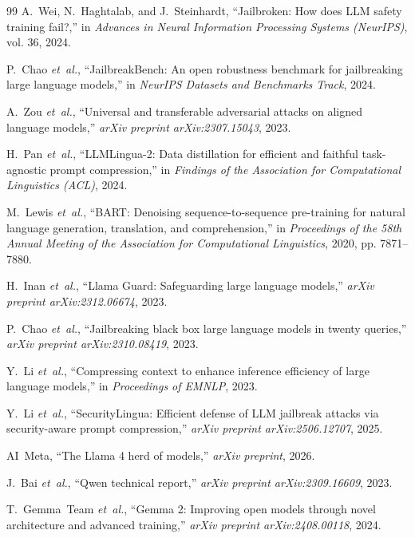 \documentclass[conference]{IEEEtran}
\begin{document}
\begin{thebibliography}{99}
A.~Wei, N.~Haghtalab, and J.~Steinhardt, ``Jailbroken: How does LLM safety training fail?,'' in \emph{Advances in Neural Information Processing Systems (NeurIPS)}, vol. 36, 2024.

P.~Chao \emph{et~al.}, ``JailbreakBench: An open robustness benchmark for jailbreaking large language models,'' in \emph{NeurIPS Datasets and Benchmarks Track}, 2024.

A.~Zou \emph{et~al.}, ``Universal and transferable adversarial attacks on aligned language models,'' \emph{arXiv preprint arXiv:2307.15043}, 2023.

H.~Pan \emph{et~al.}, ``LLMLingua-2: Data distillation for efficient and faithful task-agnostic prompt compression,'' in \emph{Findings of the Association for Computational Linguistics (ACL)}, 2024.

M.~Lewis \emph{et~al.}, ``BART: Denoising sequence-to-sequence pre-training for natural language generation, translation, and comprehension,'' in \emph{Proceedings of the 58th Annual Meeting of the Association for Computational Linguistics}, 2020, pp. 7871--7880.

H.~Inan \emph{et~al.}, ``Llama Guard: Safeguarding large language models,'' \emph{arXiv preprint arXiv:2312.06674}, 2023.

P.~Chao \emph{et~al.}, ``Jailbreaking black box large language models in twenty queries,'' \emph{arXiv preprint arXiv:2310.08419}, 2023.

Y.~Li \emph{et~al.}, ``Compressing context to enhance inference efficiency of large language models,'' in \emph{Proceedings of EMNLP}, 2023.

Y.~Li \emph{et~al.}, ``SecurityLingua: Efficient defense of LLM jailbreak attacks via security-aware prompt compression,'' \emph{arXiv preprint arXiv:2506.12707}, 2025.

AI~Meta, ``The Llama 4 herd of models,'' \emph{arXiv preprint}, 2026.

J.~Bai \emph{et~al.}, ``Qwen technical report,'' \emph{arXiv preprint arXiv:2309.16609}, 2023.

T.~Gemma~Team \emph{et~al.}, ``Gemma 2: Improving open models through novel architecture and advanced training,'' \emph{arXiv preprint arXiv:2408.00118}, 2024.

\end{thebibliography}
\end{document}
